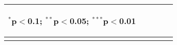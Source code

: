 \begin{table}[!htbp]
\begin{tabular}{lcccc}
{\begin{footnotesize}
$^{*}$p$<$0.1; $^{**}$p$<$0.05; $^{***}$p$<$0.01\end{footnotesize}}
\\\bottomrule\normalsize\end{tabular}\end{table} 
